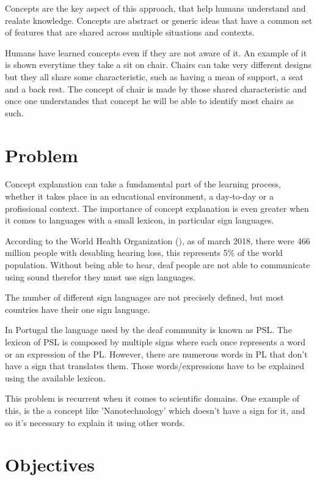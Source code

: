 Concepts are the key aspect of this approach, that help humans understand and realate knowledge.
Concepts are abstract or generic ideas that have a common set of features that are shared across multiple situations and contexts.

Humans have learned concepts even if they are not aware of it.
An example of it is shown everytime they take a sit on chair.
Chairs can take very different designs but they all share some characteristic, such as having a mean of support, a seat and a back rest.
The concept of chair is made by those shared characteristic and once one understandes that concept he will be able to identify most chairs as such.

\section{Problem}

Concept explanation can take a fundamental part of the learning process, whether it takes place in an educational environment, a day-to-day or a profissional context.
The importance of concept explanation is even greater when it comes to languages with a small lexicon, in particular sign languages.

According to the World Health Organization (\citeyear{who_2018}), as of march 2018, there were 466 million people with desabling hearing loss, this represents 5\% of the world population.
Without being able to hear, deaf people are not able to communicate using sound therefor they must use sign languages.

The number of different sign languages are not precisely defined, but most countries have their one sign language.

In Portugal the language used by the deaf community is known as \gls{PSL}.
The lexicon of \gls{PSL} is composed by multiple signs where each once represents a word or an expression of the \gls{PL}.
However, there are numerous words in \gls{PL} that don't have a sign that translates them.
Those words/expressions have to be explained using the available lexicon.

This problem is recurrent when it comes to scientific domains.
One example of this, is the a concept like 'Nanotechnology' which doesn't have a sign for it, and so it's necessary to explain it using other words.

\section{Objectives}

